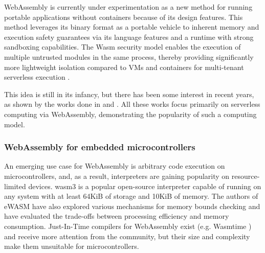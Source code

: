
WebAssembly is currently under experimentation as a new method for running portable applications without containers because of its design features. This method leverages its binary format as a portable vehicle to inherent memory and execution safety guarantees via its language features and a runtime with strong sandboxing capabilities. The Wasm security model enables the execution of multiple untrusted modules in the same process, thereby providing significantly more lightweight isolation compared to VMs and containers for multi-tenant serverless execution \cite{gadepalli2020sledge}.

This idea is still in its infancy, but there has been some interest in recent years, as shown by the works done in \cite{hall2019execution} and \cite{shillaker2020faasm}. All these works focus primarily on serverless computing via WebAssembly, demonstrating the popularity of such a computing model.

\subsubsection{WebAssembly for embedded microcontrollers}

An emerging use case for WebAssembly is arbitrary code execution on microcontrollers, and, as a result, interpreters are gaining popularity on resource-limited devices. wasm3 \cite{wasm3} is a popular open-source interpreter capable of running on any system with at least 64KiB of storage and 10KiB of memory. The authors of eWASM \cite{peach2020ewasm} have also explored various mechanisms for memory bounds checking and have evaluated the trade-offs between processing efficiency and memory consumption. Just-In-Time compilers for WebAssembly exist (e.g. Wasmtime \cite{wasmtime}) and receive more attention from the community, but their size and complexity make them unsuitable for microcontrollers.

